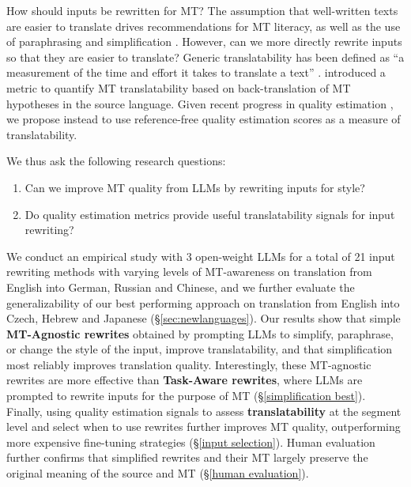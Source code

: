 How should inputs be rewritten for MT? The assumption that well-written texts are easier to translate drives recommendations for MT literacy, as well as the use of paraphrasing \citep{callison-burch-etal-2006-improved, mirkin-etal-2009-source, marton-etal-2009-improved, aziz-etal-2010-learning} and simplification  \citep{stajner-popovic-2016-text,stajner-popovic-2019-automated}. However, can we more directly rewrite inputs so that they are easier to translate? Generic translatability has been defined as “a measurement of the time and effort
it takes to translate a text” \citep{kumhyr-etal-1994-internationalization}. \citet{uchimoto-etal-2005-automatic} introduced a metric to quantify MT translatability based on back-translation of MT hypotheses in the source language. Given recent progress in quality estimation \citep{fernandes-etal-2023-devil, naskar-etal-2023-quality, tomani2024qualityaware}, we propose instead to use reference-free quality estimation scores as a measure of translatability.

We thus ask the following research questions:
\begin{enumerate}[label=(\arabic*),topsep=0pt,itemsep=-1ex,partopsep=-1ex,parsep=1ex]
    \item Can we improve MT quality from LLMs by rewriting inputs for style?
    \item Do quality estimation metrics provide useful translatability signals for input rewriting?
\end{enumerate}

We conduct an empirical study with 3 open-weight LLMs for a total of 21 input rewriting methods with varying levels of MT-awareness on translation from English into German, Russian and Chinese, and we further evaluate the generalizability of our best performing approach on translation from English into Czech, Hebrew and Japanese (\S \ref{sec:newlanguages}). 
Our results show that simple \textbf{MT-Agnostic rewrites} obtained by prompting LLMs to simplify, paraphrase, or change the style of the input, improve translatability, and that simplification most reliably improves translation quality. Interestingly, these MT-agnostic rewrites are more effective than \textbf{Task-Aware rewrites}, where LLMs are prompted to rewrite inputs for the purpose of MT (\S \ref{simplification best}). Finally, using quality estimation signals to assess \textbf{translatability} at the segment level and select when to use rewrites further improves MT quality, outperforming more expensive fine-tuning strategies (\S \ref{input selection}). Human evaluation further confirms that simplified rewrites and their MT largely preserve the original meaning of the source and MT (\S \ref{human evaluation}).

